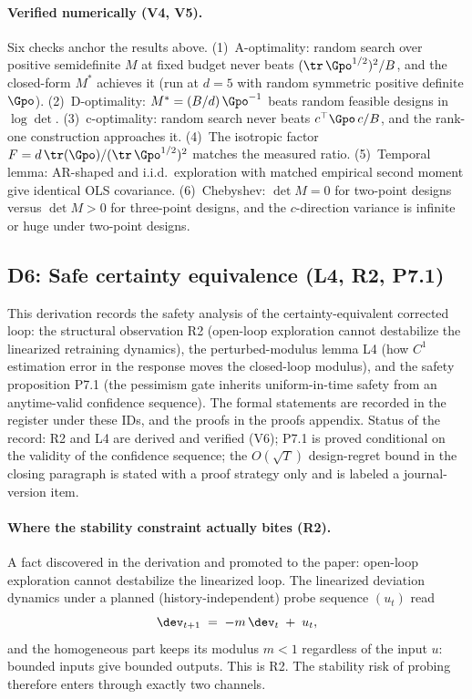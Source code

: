 \paragraph{Verified numerically (V4, V5).}
Six checks anchor the results above. (1)~A-optimality: random search over
positive semidefinite $M$ at fixed budget never beats
$(\tr\,\Gpo^{1/2})^{2}/B$, and the closed-form $M^{*}$ achieves it (run at
$d = 5$ with random symmetric positive definite $\Gpo$). (2)~D-optimality:
$M^{*} = (B/d)\,\Gpo^{-1}$ beats random feasible designs in $\log\det$.
(3)~c-optimality: random search never beats $c^\top \Gpo\, c / B$, and the
rank-one construction approaches it. (4)~The isotropic factor
$F = d\,\tr(\Gpo)/(\tr\,\Gpo^{1/2})^{2}$ matches the measured ratio.
(5)~Temporal lemma: AR-shaped and i.i.d.\ exploration with matched
empirical second moment give identical OLS covariance. (6)~Chebyshev:
$\det M = 0$ for two-point designs versus $\det M > 0$ for three-point
designs, and the $c$-direction variance is infinite or huge under
two-point designs.

\subsection*{D6: Safe certainty equivalence (L4, R2, P7.1)}

This derivation records the safety analysis of the certainty-equivalent
corrected loop: the structural observation R2 (open-loop exploration cannot
destabilize the linearized retraining dynamics), the perturbed-modulus
lemma L4 (how $C^1$ estimation error in the response moves the closed-loop
modulus), and the safety proposition P7.1 (the pessimism gate inherits
uniform-in-time safety from an anytime-valid confidence sequence). The
formal statements are recorded in the register under these IDs, and the
proofs in the proofs appendix. Status of the record: R2 and L4 are derived
and verified (V6); P7.1 is proved conditional on the validity of the
confidence sequence; the $O(\sqrt{T})$ design-regret bound in the closing
paragraph is stated with a proof strategy only and is labeled a
journal-version item.

\paragraph{Where the stability constraint actually bites (R2).}
A fact discovered in the derivation and promoted to the paper: open-loop
exploration cannot destabilize the linearized loop. The linearized
deviation dynamics under a planned (history-independent) probe sequence
$(u_t)$ read
\begin{equation*}
\dev_{t+1} \;=\; -m\,\dev_t \;+\; u_t ,
\end{equation*}
and the homogeneous part keeps its modulus $m<1$ regardless of the input
$u$: bounded inputs give bounded outputs. This is R2. The stability risk
of probing therefore enters through exactly two channels.

